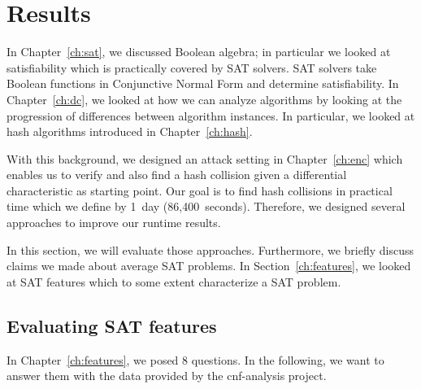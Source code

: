 \renewcommand*\chappic{img/megosat.pdf}
\renewcommand*\chapquote{}
\renewcommand*\chapquotesrc{}
\chapter{Results}
\label{ch:results}
%
In Chapter~\ref{ch:sat}, we discussed Boolean algebra; in particular we looked at
satisfiability which is practically covered by SAT solvers. SAT solvers take
Boolean functions in Conjunctive Normal Form and determine satisfiability.
In Chapter~\ref{ch:dc}, we looked at how we can analyze algorithms by looking
at the progression of differences between algorithm instances. In particular,
we looked at hash algorithms introduced in Chapter~\ref{ch:hash}.

With this background, we designed an attack setting in Chapter~\ref{ch:enc}
which enables us to verify and also find a hash collision given a differential
characteristic as starting point. Our goal is to find hash collisions
in practical time which we define by 1~day (86,400~seconds).
Therefore, we designed several approaches to improve our runtime results.

In this section, we will evaluate those approaches. Furthermore, we briefly
discuss claims we made about average SAT problems. In Section~\ref{ch:features},
we looked at SAT features which to some extent characterize a SAT problem.

\section{Evaluating SAT features}
\label{sec:results-features}
%
In Chapter~\ref{ch:features}, we posed 8 questions.
In the following, we want to answer them with the data
provided by the cnf-analysis project.

